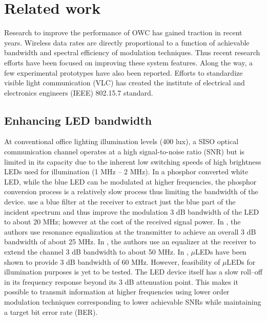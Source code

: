 \section{Related work}
\label{sec:related}
\graphicspath{{_Intro/Figures/}}

Research to improve the performance of OWC has gained traction in recent years. Wireless data rates are directly proportional to a function of achievable bandwidth and spectral efficiency of modulation techniques. Thus recent research efforts have been focused on improving these system features. Along the way, a few experimental prototypes have also been reported. Efforts to standardize visible light communication (VLC) has created the institute of electrical and electronics engineers (IEEE) 802.15.7 standard.

\subsection{Enhancing LED bandwidth}
\label{relatedBandwidth}
At conventional office lighting illumination levels (400 lux), a SISO optical communication channel operates at a high signal-to-noise ratio (SNR) but is limited in its capacity due to the inherent low switching speeds of high brightness LEDs used for illumination (1 MHz -- 2 MHz). In a phosphor converted white LED, while the blue LED can be modulated at higher frequencies, the phosphor conversion process is a relatively slow process thus limiting the bandwidth of the device. \cite{gru08b} use a blue filter at the receiver to extract just the blue part of the incident spectrum and thus improve the modulation 3 dB bandwidth of the LED to about 20 MHz; however at the cost of the received signal power.  In \cite{min08a}, the authors use resonance equalization at the transmitter to achieve an overall 3 dB bandwidth of about 25 MHz. In \cite{zen08a}, the authors use an equalizer at the receiver to extend the channel 3 dB bandwidth to about 50 MHz. In \cite{tso14a}, $\mu$LEDs have been shown to provide 3 dB bandwidth of 60 MHz. However, feasibility of $\mu$LEDs for illumination purposes is yet to be tested. The LED device itself has a slow roll--off in its frequency response beyond its 3 dB attenuation point. This makes it possible to transmit information at higher frequencies using lower order modulation techniques corresponding to lower achievable SNRs while maintaining a target bit error rate (BER).

